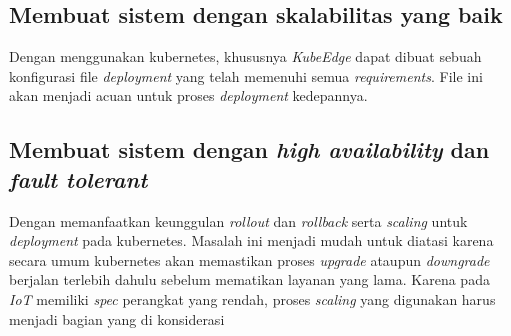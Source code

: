 \subsection{Membuat sistem dengan skalabilitas yang baik}
Dengan menggunakan kubernetes, khususnya \textit{KubeEdge} dapat dibuat sebuah konfigurasi file \textit{deployment} yang telah memenuhi semua \textit{requirements}. File ini akan menjadi acuan untuk proses \textit{deployment} kedepannya.

\subsection{Membuat sistem dengan \textit{high availability} dan \textit{fault tolerant}}
Dengan memanfaatkan keunggulan \textit{rollout} dan \textit{rollback} serta \textit{scaling} untuk \textit{deployment} pada kubernetes. Masalah ini menjadi mudah untuk diatasi karena secara umum kubernetes akan memastikan proses \textit{upgrade} ataupun \textit{downgrade} berjalan terlebih dahulu sebelum mematikan layanan yang lama. Karena pada \textit{IoT} memiliki \textit{spec} perangkat yang rendah, proses \textit{scaling} yang digunakan harus menjadi bagian yang di konsiderasi